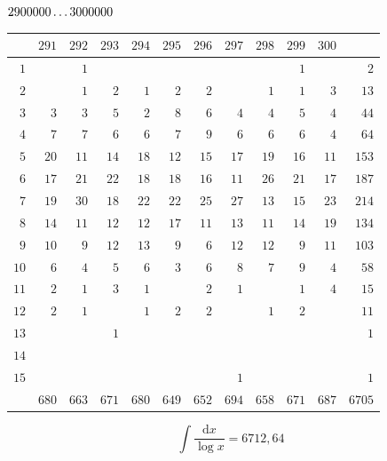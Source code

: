 \par\medskip
\noindent\begin{minipage}{\linewidth}\centering
{}
\(2900000\mathinner{.\,.\,.}3000000\)\par\smallskip
\begingroup\fontsize{10.5}{11.5}\selectfont\setlength{\tabcolsep}{3.5pt}\renewcommand{\arraystretch}{1}
\begin{tabular}{r|rrrrrrrrrr|r}\hline
 & $291$ & $292$ & $293$ & $294$ & $295$ & $296$ & $297$ & $298$ & $299$ & $300$ &  \\ \hline
$1$ &  & $1$ &  &  &  &  &  &  & $1$ &  & $2$ \\
$2$ &  & $1$ & $2$ & $1$ & $2$ & $2$ &  & $1$ & $1$ & $3$ & $13$ \\
$3$ & $3$ & $3$ & $5$ & $2$ & $8$ & $6$ & $4$ & $4$ & $5$ & $4$ & $44$ \\
$4$ & $7$ & $7$ & $6$ & $6$ & $7$ & $9$ & $6$ & $6$ & $6$ & $4$ & $64$ \\
$5$ & $20$ & $11$ & $14$ & $18$ & $12$ & $15$ & $17$ & $19$ & $16$ & $11$ & $153$ \\
$6$ & $17$ & $21$ & $22$ & $18$ & $18$ & $16$ & $11$ & $26$ & $21$ & $17$ & $187$ \\
$7$ & $19$ & $30$ & $18$ & $22$ & $22$ & $25$ & $27$ & $13$ & $15$ & $23$ & $214$ \\
$8$ & $14$ & $11$ & $12$ & $12$ & $17$ & $11$ & $13$ & $11$ & $14$ & $19$ & $134$ \\
$9$ & $10$ & $9$ & $12$ & $13$ & $9$ & $6$ & $12$ & $12$ & $9$ & $11$ & $103$ \\
$10$ & $6$ & $4$ & $5$ & $6$ & $3$ & $6$ & $8$ & $7$ & $9$ & $4$ & $58$ \\
$11$ & $2$ & $1$ & $3$ & $1$ &  & $2$ & $1$ &  & $1$ & $4$ & $15$ \\
$12$ & $2$ & $1$ &  & $1$ & $2$ & $2$ &  & $1$ & $2$ &  & $11$ \\
$13$ &  &  & $1$ &  &  &  &  &  &  &  & $1$ \\
$14$ &  &  &  &  &  &  &  &  &  &  &  \\
$15$ &  &  &  &  &  &  & $1$ &  &  &  & $1$ \\
\hline
 & $680$ & $663$ & $671$ & $680$ & $649$ & $652$ & $694$ & $658$ & $671$ & $687$ & $6705$ \\ \hline
\end{tabular}\par\endgroup
\setlength{\abovedisplayskip}{6pt}\setlength{\belowdisplayskip}{4pt}
\[\int\frac{\mathrm{d}x}{\log x}=6712{,}64\]
\end{minipage}
